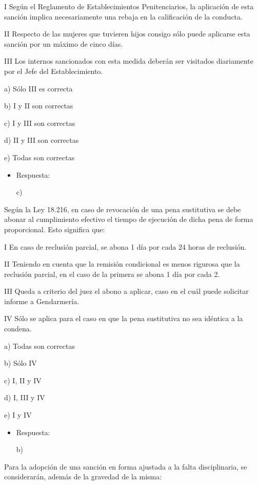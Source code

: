 \documentclass[letterpaper, 11pt]{article}
\begin{document}
I Según el Reglamento de Establecimientos Penitenciarios, la
aplicación de esta sanción implica necesariamente una rebaja en la
calificación de la conducta.

II Respecto de las mujeres que tuvieren hijos consigo sólo puede
aplicarse esta sanción por un máximo de cinco días.

III Los internos sancionados con esta medida deberán ser visitados
diariamente por el Jefe del Establecimiento.

a) Sólo III es correcta

b) I y II son correctas

c) I y III son correctas

d) II y III son correctas

e) Todas son correctas

\begin{itemize}
\item Respuesta:

c)
\end{itemize}


Según la Ley 18.216, en caso de revocación de una pena sustitutiva se
debe abonar al cumplimiento efectivo el tiempo de ejecución de dicha
pena de forma proporcional. Esto significa que:


I En caso de reclusión parcial, se abona 1 día por cada 24 horas de
reclusión.

II Teniendo en cuenta que la remisión condicional es menos rigurosa
que la reclusión parcial, en el caso de la primera se abona 1 día por
cada 2.

III Queda a criterio del juez el abono a aplicar, caso en el cuál
puede solicitar informe a Gendarmería.

IV Sólo se aplica para el caso en que la pena sustitutiva no sea
idéntica a la condena.

a) Todas son correctas

b) Sólo IV

c) I, II y IV

d) I, III y IV

e) I y IV

\begin{itemize}
\item Respuesta:

b)
\end{itemize}


Para la adopción de una sanción en forma ajustada a la falta
disciplinaria, se considerarán, además de la gravedad de la misma:
\end{document}
